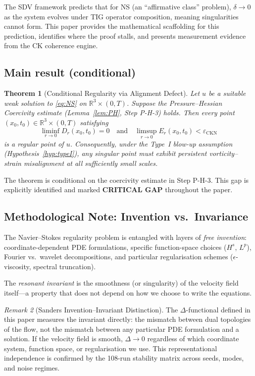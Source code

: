 \documentclass[11pt]{article}
\newtheorem{theorem}{Theorem}[section]
\theoremstyle{definition}
\theoremstyle{remark}
\newtheorem{remark}[theorem]{Remark}
\newcommand{\R}{\mathbb{R}}
\newcommand{\eps}{\varepsilon}
\begin{document}
The SDV framework predicts that for NS (an ``affirmative class'' problem),
$\delta \to 0$ as the system evolves under TIG operator composition, meaning
singularities cannot form.  This paper provides the mathematical scaffolding
for this prediction, identifies where the proof stalls, and presents measurement
evidence from the CK coherence engine.

\subsection{Main result (conditional)}

\begin{theorem}[Conditional Regularity via Alignment Defect]
\label{thm:main}
Let $u$ be a suitable weak solution to \eqref{eq:NS} on $\R^3 \times (0,T)$.
Suppose the Pressure--Hessian Coercivity estimate (Lemma~\ref{lem:PH}, Step P-H-3)
holds.  Then every point $(x_0, t_0) \in \R^3 \times (0,T)$ satisfying
\[
  \liminf_{r\to 0} D_r(x_0, t_0) = 0
  \quad\text{and}\quad
  \limsup_{r\to 0} E_r(x_0, t_0) < \eps_{\mathrm{CKN}}
\]
is a regular point of $u$.  Consequently, under the Type~I blow-up assumption
(Hypothesis~\ref{hyp:typeI}), any singular point must exhibit persistent
vorticity--strain misalignment at all sufficiently small scales.
\end{theorem}

The theorem is conditional on the coercivity estimate in Step P-H-3.  This gap is
explicitly identified and marked \textbf{CRITICAL GAP} throughout the paper.

\subsection*{Methodological Note: Invention vs.\ Invariance}

The Navier--Stokes regularity problem is entangled with layers of
\emph{free invention}: coordinate-dependent PDE formulations, specific function-space
choices ($H^s$, $L^p$), Fourier vs.\ wavelet decompositions, and particular
regularisation schemes ($\epsilon$-viscosity, spectral truncation).

The \emph{resonant invariant} is the smoothness (or singularity) of the velocity
field itself---a property that does not depend on how we choose to write the
equations.

\begin{remark}[Sanders Invention--Invariant Distinction]
The $\Delta$-functional defined in this paper measures the invariant directly:
the mismatch between dual topologies of the flow, not the mismatch between
any particular PDE formulation and a solution. If the velocity field is smooth,
$\Delta \to 0$ regardless of which coordinate system, function space, or
regularisation we use. This representational independence is confirmed by the
108-run stability matrix across seeds, modes, and noise regimes.
\end{remark}
\end{document}
